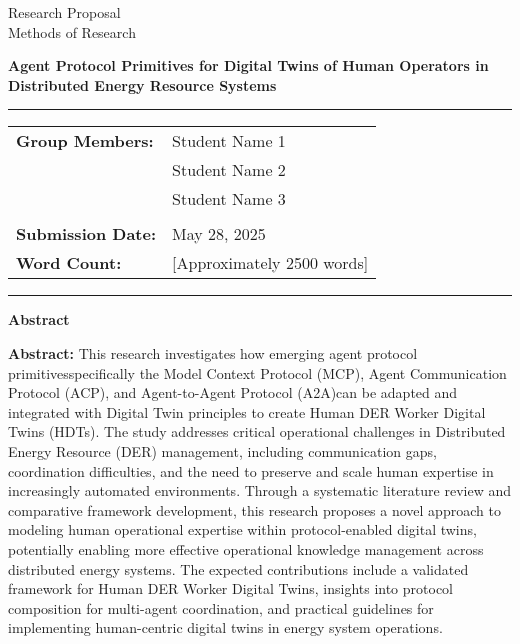 \documentclass[12pt,a4paper]{article}
\newcommand{\studentone}{Student Name 1}
\newcommand{\studenttwo}{Student Name 2}
\newcommand{\studentthree}{Student Name 3}
\newcommand{\projecttitle}{Agent Protocol Primitives for Digital Twins of Human Operators in Distributed Energy Resource Systems}
\newcommand{\submissiondate}{May 28, 2025}
\newcommand{\emdash}{\textemdash}
\begin{document}
\begin{titlepage}
\begin{center}
{\Huge{Research Proposal}} \\
\vspace{5mm}
{\Large{Methods of Research}} \\

\vspace{10mm}

{\huge{\textbf{\projecttitle}}} \\

\vspace{15mm}

\hrule
\vspace{3mm}
\begin{tabular}{ll}
\textbf{Group Members:} & {\studentone} \\
& {\studenttwo} \\
& {\studentthree} \\
\\
\textbf{Submission Date:} & {\submissiondate} \\
\textbf{Word Count:} & [Approximately 2500 words] \\
\end{tabular}
\vspace{3mm}
\hrule

\vspace{15mm}

\textbf{Abstract} \\
\vspace{2mm}
\begin{minipage}{0.8\textwidth}
\textbf{Abstract:} This research investigates how emerging agent protocol primitives\emdash{}specifically the Model Context Protocol (MCP), Agent Communication Protocol (ACP), and Agent-to-Agent Protocol (A2A)\emdash{}can be adapted and integrated with Digital Twin principles to create Human DER Worker Digital Twins (HDTs). The study addresses critical operational challenges in Distributed Energy Resource (DER) management, including communication gaps, coordination difficulties, and the need to preserve and scale human expertise in increasingly automated environments. Through a systematic literature review and comparative framework development, this research proposes a novel approach to modeling human operational expertise within protocol-enabled digital twins, potentially enabling more effective operational knowledge management across distributed energy systems. The expected contributions include a validated framework for Human DER Worker Digital Twins, insights into protocol composition for multi-agent coordination, and practical guidelines for implementing human-centric digital twins in energy system operations.
\end{minipage}

\end{center}
\end{titlepage}
\end{document}
